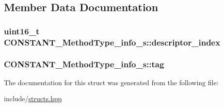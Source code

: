 \subsection{Member Data Documentation}
\hypertarget{structCONSTANT__MethodType__info__s_afb5f88f171fd11196c453eedceb70117}{
\subsubsection[{descriptor\+\_\+index}]{\setlength{\rightskip}{0pt plus 5cm}uint16\+\_\+t C\+O\+N\+S\+T\+A\+N\+T\+\_\+\+Method\+Type\+\_\+info\+\_\+s\+::descriptor\+\_\+index}}\label{structCONSTANT__MethodType__info__s_afb5f88f171fd11196c453eedceb70117}
\hypertarget{structCONSTANT__MethodType__info__s_a0218ac52c1a8a8eebd94e09eda7949c6}{
\subsubsection[{tag}]{ C\+O\+N\+S\+T\+A\+N\+T\+\_\+\+Method\+Type\+\_\+info\+\_\+s\+::tag}}\label{structCONSTANT__MethodType__info__s_a0218ac52c1a8a8eebd94e09eda7949c6}


The documentation for this struct was generated from the following file\+:\begin{DoxyCompactItemize}
\item 
include/\hyperlink{structs_8hpp}{structs.\+hpp}\end{DoxyCompactItemize}
